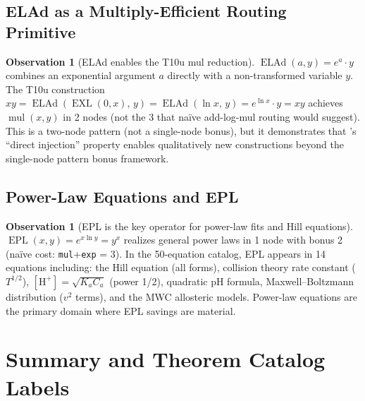 \documentclass[12pt,a4paper]{article}
\theoremstyle{definition}
\newtheorem{observation}[theorem]{Observation}
\newcommand{\EXL}{\operatorname{EXL}}
\newcommand{\ELAd}{\operatorname{ELAd}}
\newcommand{\EPL}{\operatorname{EPL}}
\begin{document}
\subsection{ELAd as a Multiply-Efficient Routing Primitive}

\begin{observation}[ELAd enables the T10u mul reduction]
\label{obs:elad}
$\ELAd(a,y) = e^a \cdot y$ combines an exponential argument $a$ directly
with a non-transformed variable $y$.  The T10u construction
$xy = \ELAd(\EXL(0,x),\,y) = \ELAd(\ln x,\,y) = e^{\ln x} \cdot y = xy$
achieves $\operatorname{mul}(x,y)$ in 2 nodes (not the 3 that na\"{i}ve
add-log-mul routing would suggest).
This is a two-node pattern (not a single-node bonus), but it demonstrates
that \ELAd's ``direct injection'' property enables qualitatively new
constructions beyond the single-node pattern bonus framework.
\end{observation}

\subsection{Power-Law Equations and EPL}

\begin{observation}[EPL is the key operator for power-law fits and Hill equations]
\label{obs:epl}
$\EPL(x,y) = e^{x \ln y} = y^x$ realizes general power laws in 1 node with
bonus 2 (na\"{i}ve cost: \texttt{mul}+\texttt{exp} = 3).
In the 50-equation catalog, EPL appears in 14 equations including:
the Hill equation (all forms), collision theory rate constant ($T^{1/2}$),
$[\mathrm{H}^+]=\sqrt{K_a C_a}$ (power 1/2), quadratic pH formula, Maxwell--Boltzmann
distribution ($v^2$ terms), and the MWC allosteric models.
Power-law equations are the primary domain where EPL savings are material.
\end{observation}

\section{Summary and Theorem Catalog Labels}
\label{sec:summary}
\end{document}
